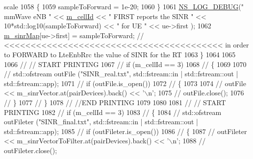 \begin{DoxyCode}
{       scale}
1058                                 \{
1059                                         sampleToForward = 1e-20;
1060                                 \}
1061                                 \hyperlink{group__logging_ga413f1886406d49f59a6a0a89b77b4d0a}{NS\_LOG\_DEBUG}(\textcolor{stringliteral}{" mmWave eNB "} << 
      \hyperlink{classns3_1_1MmWavePhy_a0594531da45f93220d4f5de292bae823}{m\_cellId} << \textcolor{stringliteral}{" FIRST reports the SINR "} << 10*std::log10(sampleToForward) << \textcolor{stringliteral}{" for UE "} << ue->first
      );
1062                                 \hyperlink{classns3_1_1MmWaveEnbPhy_a754de7cf4bdbe107dfb006a5b332842a}{m\_sinrMap}[ue->first] = sampleToForward; \textcolor{comment}{//
       <<<<<<<<<<<<<<<<<<<<<<<<<<<<<<<<<<<<<<<<< in order to FORWARD to LteEnbRrc the value of SINR for the RT}
1063                         \}
1064 
1065                         
1066                         \textcolor{comment}{// // START PRINTING }
1067                         \textcolor{comment}{// if (m\_cellId == 3)}
1068                         \textcolor{comment}{// \{}
1069                         
1070                         \textcolor{comment}{//      std::ofstream outFile ("SINR\_real.txt", std::fstream::in |
       std::fstream::out | std::fstream::app);}
1071                         \textcolor{comment}{//      if (outFile.is\_open())}
1072                         \textcolor{comment}{//      \{}
1073 
1074                         \textcolor{comment}{//              outFile << m\_sinrVector.at(pairDevices).back() << '\(\backslash\)n';}
1075                         \textcolor{comment}{//              outFile.close();}
1076                         \textcolor{comment}{//      \}}
1077                         \textcolor{comment}{// \}}
1078                         \textcolor{comment}{// //END PRINTING }
1079 
1080 
1081                         \textcolor{comment}{// // START PRINTING}
1082                         \textcolor{comment}{// if (m\_cellId == 3)}
1083                         \textcolor{comment}{// \{}
1084                         \textcolor{comment}{//      std::ofstream outFileter ("SINR\_final.txt", std::fstream::in |
       std::fstream::out | std::fstream::app);}
1085                         \textcolor{comment}{//      if (outFileter.is\_open())}
1086                         \textcolor{comment}{//      \{}
1087                         \textcolor{comment}{//              outFileter << m\_sinrVectorToFilter.at(pairDevices).back() << '\(\backslash\)n';}
1088                         \textcolor{comment}{//              outFileter.close();}

\end{DoxyCode}
